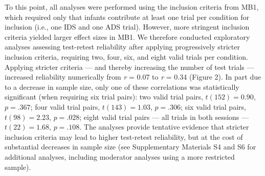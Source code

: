 \documentclass[
  man,floatsintext]{apa6}
\begin{document}
To this point, all analyses were performed using the inclusion criteria from MB1, which required only that infants contribute at least one trial per condition for inclusion (i.e., one IDS and one ADS trial).
However, more stringent inclusion criteria yielded larger effect sizes in MB1.
We therefore conducted exploratory analyses assessing test-retest reliability after applying progressively stricter inclusion criteria, requiring two, four, six, and eight valid trials per condition.
Applying stricter criteria --- and thereby increasing the number of test trials --- increased reliability numerically from \emph{r} = 0.07 to \emph{r} = 0.34 (Figure 2).
In part due to a decrease in sample size, only one of these correlations was statistically significant (when requiring six trial pairs): two valid trial pairs, \(t(152) = 0.90\), \(p = .367\); four valid trial pairs, \(t(143) = 1.03\), \(p = .306\); six valid trial pairs, \(t(98) = 2.23\), \(p = .028\); eight valid trial pairs --- all trials in both sessions --- \(t(22) = 1.68\), \(p = .108\).
The analyses provide tentative evidence that stricter inclusion criteria may lead to higher test-retest reliability, but at the cost of substantial decreases in sample size (see Supplementary Materials S4 and S6 for additional analyses, including moderator analyses using a more restricted sample).
\end{document}
